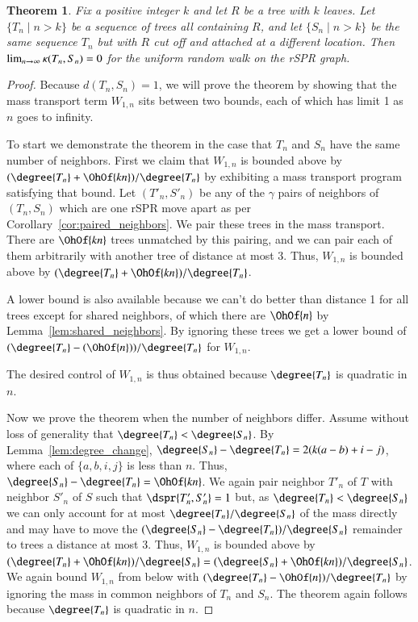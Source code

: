 \documentclass[]{elsarticle}
\newtheorem{thm}{Theorem}[section]
\newcommand{\curvature}[2][]{%
    \ifthenelse{\equal{#1}{}}%
		{\kappa(#2)}%
		{\kappa_{#1}(#2)}%
}
\newcommand{\overlap}{%
	\gamma
}
\begin{document}
\begin{thm}
\label{thm:flat_curvature}
Fix a positive integer $k$ and let $R$ be a tree with $k$ leaves.
Let $\{T_n \mid n > k\}$ be a sequence of trees all containing $R$, and let $\{S_n \mid n > k\}$ be the same sequence $T_n$ but with $R$ cut off and attached at a different location.
Then $\lim_{n \rightarrow \infty} \curvature{T_n,S_n} = 0$ for the uniform random walk on the rSPR graph.
\end{thm}
\begin{proof}
Because $d(T_n, S_n) = 1$, we will prove the theorem by showing that the mass transport term $W_{1,n}$ sits between two bounds, each of which has limit 1 as $n$ goes to infinity.

To start we demonstrate the theorem in the case that $T_n$ and $S_n$ have the same number of neighbors.
First we claim that $W_{1,n}$ is bounded above by $(\degree{T_n}+\OhOf{kn})/\degree{T_n}$ by exhibiting a mass transport program satisfying that bound.
Let $(T'_n, S'_n)$ be any of the $\overlap$ pairs of neighbors of $(T_n, S_n)$ which are one rSPR move apart as per Corollary~\ref{cor:paired_neighbors}.
We pair these trees in the mass transport.
There are $\OhOf{kn}$ trees unmatched by this pairing, and we can pair each of them arbitrarily with another tree of distance at most 3.
Thus, $W_{1,n}$ is bounded above by $(\degree{T_n} + \OhOf{kn}) / \degree{T_n}$.

A lower bound is also available because we can't do better than distance 1 for all trees except for shared neighbors, of which there are $\OhOf{n}$ by Lemma~\ref{lem:shared_neighbors}.
By ignoring these trees we get a lower bound of $(\degree{T_n} - (\OhOf{n}))/\degree{T_n}$ for $W_{1,n}$.

The desired control of $W_{1,n}$ is thus obtained because $\degree{T_n}$ is quadratic in $n$.

Now we prove the theorem when the number of neighbors differ.
Assume without loss of generality that $\degree{T_n} < \degree{S_n}$.
By Lemma~\ref{lem:degree_change}, $\degree{S_n} - \degree{T_n} = 2(k(a-b) + i - j)$, where each of $\{a,b,i,j\}$ is less than $n$.
Thus, $\degree{S_n} - \degree{T_n} = \OhOf{kn}$.
We again pair neighbor $T'_n$ of $T$ with neighbor $S'_n$ of $S$ such that $\dspr{T'_n, S'_n}=1$ but, as $\degree{T_n} < \degree{S_n}$ we can only account for at most $\degree{T_n} / \degree{S_n}$ of the mass directly and may have to move the $(\degree{S_n} - \degree{T_n}) / \degree{S_n}$ remainder to trees a distance at most 3.
Thus, $W_{1,n}$ is bounded above by $(\degree{T_n} + \OhOf{kn}) / \degree{S_n} = (\degree{S_n} + \OhOf{kn}) / \degree{S_n}$.
We again bound $W_{1,n}$ from below with $(\degree{T_n} - \OhOf{n}) / \degree{T_n}$ by ignoring the mass in common neighbors of $T_n$ and $S_n$.
The theorem again follows because $\degree{T_n}$ is quadratic in $n$.
\end{proof}
\end{document}
